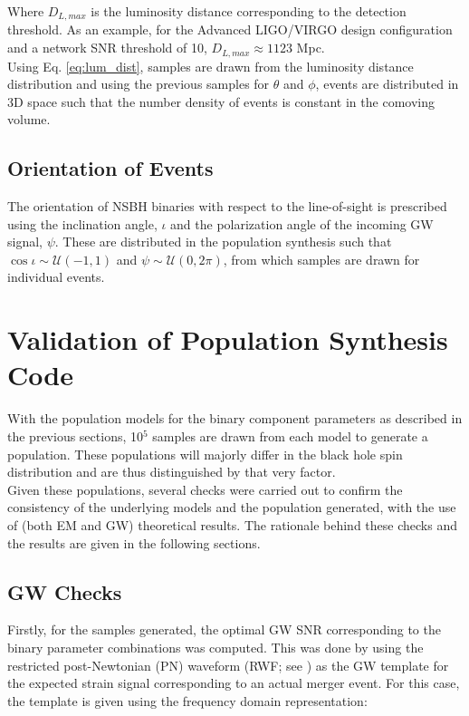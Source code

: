         Where $D_{L, max}$ is the luminosity distance corresponding to the detection
        threshold. As an example, for the Advanced LIGO/VIRGO design configuration and a
        network SNR threshold of 10, $D_{L, max} \approx 1123$ Mpc.\\
        Using Eq. \ref{eq:lum_dist}, samples are drawn from the luminosity distance
        distribution and using the previous samples for $\theta$ and $\phi$, events are
        distributed in 3D space such that the number density of events is constant in
        the comoving volume.

    \subsection{Orientation of Events}\label{sub:orientation_of_events}

        The orientation of NSBH binaries with respect to the line-of-sight is prescribed
        using the inclination angle, $\iota$ and the polarization angle of the incoming
        GW signal, $\psi$. These are distributed in the population synthesis such that
        $\cos\iota \sim \mathcal{U}(-1, 1)$ and $\psi \sim \mathcal{U}(0, 2\pi)$, from
        which samples are drawn for individual events.

\section{Validation of Population Synthesis Code}\label{sec:popsyn_validation}

    With the population models for the binary component parameters as described in the
    previous sections, 10$^5$ samples are drawn from each model to generate a
    population.  These populations will majorly differ in the black hole spin
    distribution and are thus distinguished by that very factor.\\
    Given these populations, several checks were carried out to confirm the consistency
    of the underlying models and the population generated, with the use of (both EM and
    GW) theoretical results. The rationale behind these checks and the results are given
    in the following sections.

    \subsection{GW Checks}\label{sub:gw_checks}

        Firstly, for the samples generated, the optimal GW SNR corresponding to the
        binary parameter combinations was computed. This was done by using the
        restricted post-Newtonian (PN) waveform (RWF; see \cite{cutler_1994}) as the GW
        template for the expected strain signal corresponding to an actual merger event.
        For this case, the template is given using the frequency domain representation:

